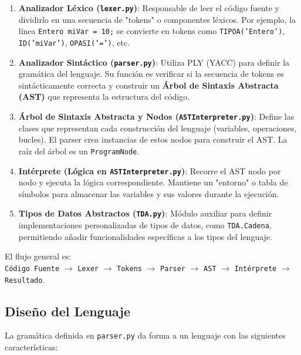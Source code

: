 \documentclass{article}
\begin{document}
\begin{enumerate}
    \item \textbf{Analizador Léxico (\texttt{lexer.py})}: Responsable de leer el código fuente y dividirlo en una secuencia de "tokens" o componentes léxicos. Por ejemplo, la línea \texttt{Entero miVar = 10;} se convierte en tokens como \texttt{TIPOA('Entero')}, \texttt{ID('miVar')}, \texttt{OPASI('=')}, etc.

    \item \textbf{Analizador Sintáctico (\texttt{parser.py})}: Utiliza PLY (YACC) para definir la gramática del lenguaje. Su función es verificar si la secuencia de tokens es sintácticamente correcta y construir un \textbf{Árbol de Sintaxis Abstracta (AST)} que representa la estructura del código.

    \item \textbf{Árbol de Sintaxis Abstracta y Nodos (\texttt{ASTInterpreter.py})}: Define las clases que representan cada construcción del lenguaje (variables, operaciones, bucles). El parser crea instancias de estos nodos para construir el AST. La raíz del árbol es un \texttt{ProgramNode}.

    \item \textbf{Intérprete (Lógica en \texttt{ASTInterpreter.py})}: Recorre el AST nodo por nodo y ejecuta la lógica correspondiente. Mantiene un "entorno" o tabla de símbolos para almacenar las variables y sus valores durante la ejecución.

    \item \textbf{Tipos de Datos Abstractos (\texttt{TDA.py})}: Módulo auxiliar para definir implementaciones personalizadas de tipos de datos, como \texttt{TDA.Cadena}, permitiendo añadir funcionalidades específicas a los tipos del lenguaje.
\end{enumerate}

El flujo general es: \\
\texttt{Código Fuente} $\rightarrow$ \texttt{Lexer} $\rightarrow$ \texttt{Tokens} $\rightarrow$ \texttt{Parser} $\rightarrow$ \texttt{AST} $\rightarrow$ \texttt{Intérprete} $\rightarrow$ \texttt{Resultado}.




\subsection{Diseño del Lenguaje}

La gramática definida en \texttt{parser.py} da forma a un lenguaje con las siguientes características:
\end{document}
